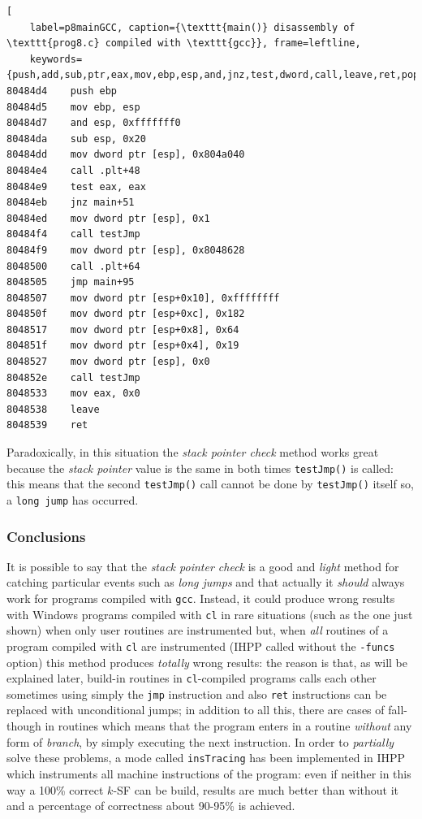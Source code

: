 \documentclass[a4paper,10pt]{report}
\begin{document}
\begin{lstlisting}[ 
	label=p8mainGCC, caption={\texttt{main()} disassembly of \texttt{prog8.c} compiled with \texttt{gcc}}, frame=leftline, 
	keywords={push,add,sub,ptr,eax,mov,ebp,esp,and,jnz,test,dword,call,leave,ret,pop,jmp}]
80484d4    push ebp
80484d5    mov ebp, esp
80484d7    and esp, 0xfffffff0
80484da    sub esp, 0x20
80484dd    mov dword ptr [esp], 0x804a040
80484e4    call .plt+48
80484e9    test eax, eax
80484eb    jnz main+51
80484ed    mov dword ptr [esp], 0x1
80484f4    call testJmp
80484f9    mov dword ptr [esp], 0x8048628
8048500    call .plt+64
8048505    jmp main+95
8048507    mov dword ptr [esp+0x10], 0xffffffff
804850f    mov dword ptr [esp+0xc], 0x182
8048517    mov dword ptr [esp+0x8], 0x64
804851f    mov dword ptr [esp+0x4], 0x19
8048527    mov dword ptr [esp], 0x0
804852e    call testJmp
8048533    mov eax, 0x0
8048538    leave 
8048539    ret 
\end{lstlisting}

\noindent
Paradoxically, in this situation the \emph{stack pointer check} method works
great because the \emph{stack pointer} value is the same in both times \verb|testJmp()|
is called: this means that the second \verb|testJmp()| call cannot be done by \verb|testJmp()| itself so, a \verb|long jump| has occurred.

\subsubsection{Conclusions}
It is possible to say that the \emph{stack pointer check} is
a good and \emph{light} method for catching particular events such as \emph{long jumps}
and that actually it \emph{should} always work for programs compiled with \verb|gcc|.
Instead, it could produce wrong results with Windows programs compiled with \verb|cl|
in rare situations (such as the one just shown) when only user routines are instrumented but, when \emph{all} routines of a program compiled with \verb|cl| are instrumented (IHPP called without the \verb|-funcs| option) this method produces \emph{totally} wrong results:
the reason is that, as will be explained later, build-in routines in \verb|cl|-compiled programs calls each other sometimes using simply the \verb|jmp| instruction and also 
\verb|ret| instructions can be replaced with unconditional jumps; in addition to
all this, there are cases of fall-though in routines which means that the program 
enters in a routine \emph{without} any form of \emph{branch}, by simply executing 
the next instruction. In order to \emph{partially} solve these problems, 
a mode called \verb|insTracing| has been implemented in IHPP which instruments all machine instructions of the program: even if neither in this way a 100\% correct $k$-SF 
can be build, results are much better than without it and a percentage of correctness 
about 90-95\% is achieved.    
\end{document}
